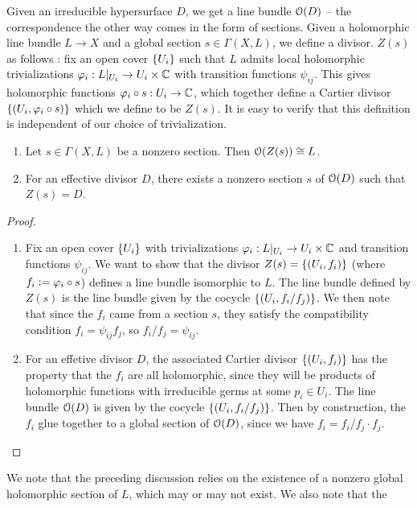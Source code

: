 Given an irreducible hypersurface $D$, we get a line bundle $\mathcal{O}(D)$ -- the
correspondence the other way comes in the form of sections. Given a holomorphic
line bundle $L \to X$ and a global section $s \in \Gamma(X,L)$, we define a divisor.
$Z(s)$ as follows : fix an open cover $\left\lbrace U_i \right\rbrace$ such that $L$ admits local
holomorphic trivializations $\varphi_i :L\vert_{U_i} \to U_i \times \mathbb{C}$ with
transition functions $\psi_{ij}$. This gives holomorphic functions
$\varphi_i \circ s : U_i \to \mathbb{C}$, which together define a Cartier divisor
$\left\lbrace (U_i, \varphi_i \circ s) \right\rbrace$ which we define to be $Z(s)$. It is easy to
verify that this definition is independent of our choice of trivialization.
%
\begin{prop} \enumbreak
\begin{enumerate}
  \item Let $s \in \Gamma(X,L)$ be a nonzero section. Then $\mathcal{O}(Z(s)) \cong L$.
  \item For an effective divisor $D$, there exists a nonzero section $s$ of $\mathcal{O}(D)$
  such that $Z(s) = D$.
\end{enumerate}
\end{prop}
%
\begin{proof} \enumbreak
\begin{enumerate}
  \item Fix an open cover $\left\lbrace U_i \right\rbrace$ with trivializations
  $\varphi_i : L\vert_{U_i} \to U_i \times \mathbb{C}$ and transition functions
  $\psi_{ij}$. We want to show that the divisor $Z(s) = \left\lbrace (U_i, f_i) \right\rbrace$
  (where $f_i \vcentcolon= \varphi_i \circ s$) defines a line bundle isomorphic to $L$.
  The line bundle defined by $Z(s)$ is the line bundle given by the cocycle
  $\left\lbrace (U_i, f_i/f_j) \right\rbrace$. We then note that since the $f_i$ came from a section $s$,
  they satisfy the compatibility condition $f_i = \psi_{ij}f_j$, so
  $f_i/f_j = \psi_{ij}$.
  \item For an effetive divisor $D$, the associated Cartier divisor
  $\left\lbrace (U_i,f_i) \right\rbrace$ has the property that the $f_i$ are all holomorphic,
  since they will be products of holomorphic functions with irreducible germs
  at some $p_i \in U_i$. The line bundle $\mathcal{O}(D)$ is given by the cocycle
  $\left\lbrace (U_i, f_i/f_j) \right\rbrace$. Then by construction, the $f_i$ glue
  together to a global section of $\mathcal{O}(D)$, since we have $f_i = f_i/f_j \cdot f_j$.
\end{enumerate}
\end{proof}
%
We note that the preceding discussion relies on the existence of a nonzero global
holomorphic section of $L$, which may or may not exist. We also note that the
